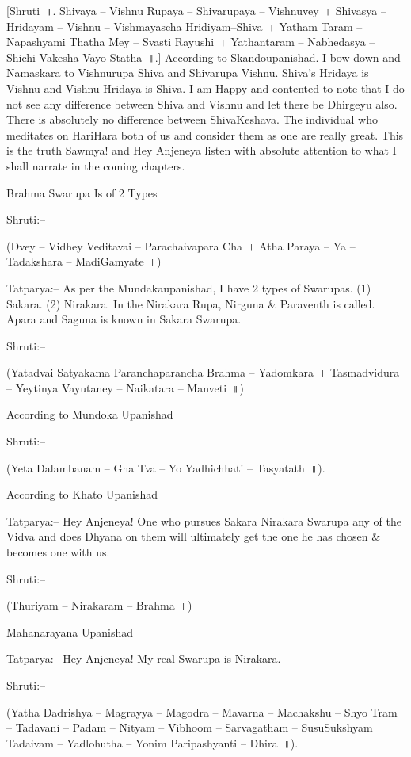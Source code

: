 [Shruti~॥. Shivaya – Vishnu Rupaya – Shivarupaya – Vishnuvey~। Shivasya – Hridayam – Vishnu – Vishmayascha Hridiyam–Shiva~। Yatham Taram – Napashyami Thatha Mey – Svasti Rayushi~। Yathantaram – Nabhedasya – Shichi Vakesha Vayo Statha~॥.] According to Skandoupanishad. I bow down and Namaskara to Vishnurupa Shiva and Shivarupa Vishnu. Shiva's Hridaya is Vishnu and Vishnu Hridaya is Shiva. I am Happy and contented to note that I do not see any difference between Shiva and Vishnu and let there be Dhirgeyu also. There is absolutely no difference between ShivaKeshava. The individual who meditates on HariHara both of us and consider them as one are really great. This is the truth Sawmya! and Hey Anjeneya listen with absolute attention to what I shall narrate in the coming chapters.

Brahma Swarupa Is of 2 Types

Shruti:–

(Dvey – Vidhey Veditavai – Parachaivapara Cha~। Atha Paraya – Ya – Tadakshara – MadiGamyate~॥)

Tatparya:– As per the Mundakaupanishad, I have 2 types of Swarupas. (1) Sakara. (2) Nirakara. In the Nirakara Rupa, Nirguna \& Paraventh is called. Apara and Saguna is known in Sakara Swarupa.

Shruti:–

(Yatadvai Satyakama Paranchaparancha Brahma – Yadomkara~। Tasmadvidura – Yeytinya Vayutaney – Naikatara – Manveti~॥)

According to Mundoka Upanishad

Shruti:–

(Yeta Dalambanam – Gna Tva – Yo Yadhichhati – Tasyatath~॥).

According to Khato Upanishad

Tatparya:– Hey Anjeneya! One who pursues Sakara Nirakara Swarupa any of the Vidva and does Dhyana on them will ultimately get the one he has chosen \& becomes one with us.

Shruti:–

(Thuriyam – Nirakaram – Brahma~॥)

Mahanarayana Upanishad

Tatparya:– Hey Anjeneya! My real Swarupa is Nirakara.

Shruti:–

(Yatha Dadrishya – Magrayya – Magodra – Mavarna – Machakshu – Shyo Tram – Tadavani – Padam – Nityam – Vibhoom – Sarvagatham – SusuSukshyam Tadaivam – Yadlohutha – Yonim Paripashyanti – Dhira~॥).

